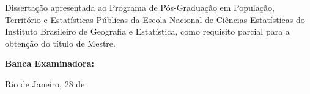 \begin{folhadeaprovacao}

  \begin{center}
    {\ABNTEXchapterfont\bfseries\imprimirinstituicao} \par
    \vspace*{\fill}\vspace*{\fill}
    {\ABNTEXchapterfont\bfseries\imprimirautor} \par
    \vspace*{\fill}
	{\ABNTEXchapterfont\bfseries \imprimirtitulo} \par
        \hspace{.30\textwidth}
        
    \begin{flushleft}
      Dissertação apresentada ao Programa de Pós-Graduação em População, Território e Estatísticas Públicas da Escola Nacional de Ciências Estatísticas do Instituto Brasileiro de Geografia e Estatística, como requisito parcial para a obtenção do título de Mestre. 
    \end{flushleft}
  \end{center}
      

\begin{flushleft}
  {\ABNTEXchapterfont\bfseries  Banca Examinadora:}

\end{flushleft}

\begin{flushright}
\parbox{10cm}{
}
\end{flushright}

\begin{center}
  \vspace*{0.5cm}
  {Rio de Janeiro, 28 de \imprimirdata} %
  \vspace*{1cm}
\end{center}

\end{folhadeaprovacao}